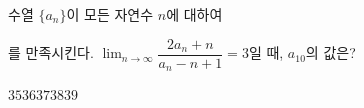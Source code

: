 수열 $\{a_n\}$이 모든 자연수 $n$에 대하여 \par\smallskip{}\par\smallskip\noindent 를 만족시킨다. $\displaystyle\lim_{n\to\infty}\dfrac{2a_n+n}{a_n-n+1}=3$일 때, $a_{10}$의 값은? 
\begin{choices32}{$35$}{$36$}{$37$}{$38$}{$39$}\end{choices32}
